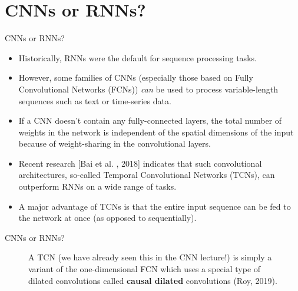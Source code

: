 
\section{CNNs or RNNs?}

\begin{frame} {CNNs or RNNs?}
  \begin{itemize}
    \item Historically, RNNs were the default for sequence processing tasks.
    \item However, some families of CNNs (especially those based on Fully Convolutional Networks (FCNs)) \textit{can} be used to process variable-length sequences such as text or time-series data.
    \item If a CNN doesn't contain any fully-connected layers, the total number of weights in the network is independent of the spatial dimensions of the input because of weight-sharing in the convolutional layers.
    \item Recent research [Bai et al. , 2018] indicates that such convolutional architectures, so-called Temporal Convolutional Networks (TCNs), can outperform RNNs on a wide range of tasks.
    \item A major advantage of TCNs is that the entire input sequence can be fed to the network at once (as opposed to sequentially).
  \end{itemize}
\end{frame}

\begin{frame} {CNNs or RNNs?}
  \begin{figure}
      \centering
      \caption{A TCN (we have already seen this in the CNN lecture!) is simply a variant of the one-dimensional FCN which uses a special type of dilated convolutions called \textbf{causal dilated} convolutions (Roy, 2019).}
  \end{figure}
\end{frame}



